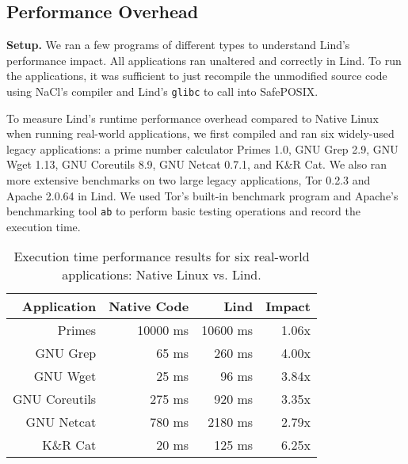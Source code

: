 {{{\subsection{Performance Overhead}
\label{Performance-Evaluation}


\noindent
\textbf{Setup.}
We ran a few programs of different types to understand Lind's performance
impact.  All applications ran unaltered and correctly in Lind. To run the
applications, it was sufficient to just recompile the unmodified
source code using NaCl's compiler and Lind's \texttt{glibc} to call
into SafePOSIX.

To measure Lind's runtime performance overhead compared to Native Linux
 when running real-world applications,
we first compiled and ran six widely-used legacy applications:
a prime number calculator Primes 1.0,
GNU Grep 2.9, GNU Wget 1.13, GNU Coreutils 8.9,
GNU Netcat 0.7.1, and K\&R Cat.
We also ran more extensive benchmarks on two large legacy applications,
Tor 0.2.3 and Apache 2.0.64 in Lind.
We used Tor's built-in benchmark program and Apache's benchmarking tool
\texttt{ab} to perform basic testing operations and record the execution time.

\begin{table}
\centering
\scriptsize
\begin{tabular}{|r|r|r|r|}
  \hline
  {\bf Application} & {\bf Native Code} & {\bf Lind} & {\bf Impact}  \\
  \hline
  Primes & 10000 ms & 10600 ms & 1.06x \\
  GNU Grep & 65 ms & 260 ms & 4.00x \\
  GNU Wget & 25 ms & 96 ms & 3.84x \\
  GNU Coreutils & 275 ms & 920 ms & 3.35x \\
  GNU Netcat & 780 ms & 2180 ms & 2.79x \\
  K\&R Cat & 20 ms & 125 ms & 6.25x \\
  \hline
\end{tabular}
\caption{\small Execution time performance results for six real-world applications: Native
Linux vs. Lind.}
\label{table:performance_apps}
\end{table}

}}}
